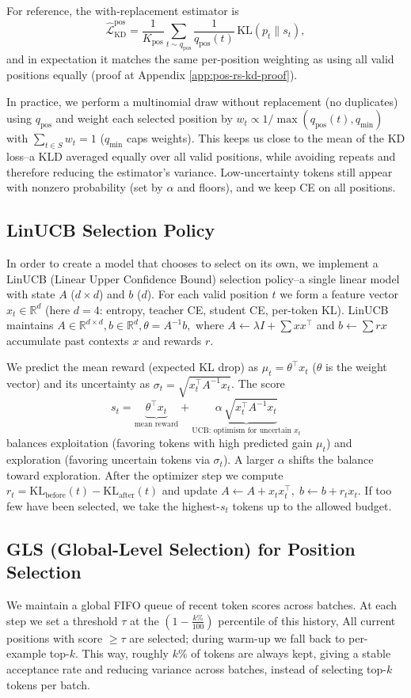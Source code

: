 \documentclass[11pt]{article}
\begin{document}
For reference, the with-replacement estimator is
\[
	\widehat{\mathcal{L}}_{\text{KD}}^{\text{pos}}
	=\frac{1}{K_{\text{pos}}}\sum_{t\sim q_{\text{pos}}}\frac{1}{q_{\text{pos}}(t)}
	\,\mathrm{KL}(p_t\|s_t),
\]
and in expectation it matches the same per-position weighting as using all valid positions equally (proof at Appendix \ref{app:pos-rs-kd-proof}).

In practice, we perform a multinomial draw without replacement (no duplicates) using $q_{\text{pos}}$ and weight each selected position by
$w_t \propto 1/\max(q_{\text{pos}}(t),q_{\min})$ with $\sum_{t\in S} w_t=1$ ($q_{\min}$ caps weights).
This keeps us close to the mean of the KD loss--a KLD averaged equally over all valid positions, while avoiding repeats and therefore reducing the estimator's variance.
Low-uncertainty tokens still appear with nonzero probability (set by $\alpha$ and floors), and we keep CE on all positions.

\subsection{LinUCB Selection Policy}
In order to create a model that chooses to select on its own, we implement a LinUCB (Linear Upper Confidence Bound) selection policy--a single linear model with state $A$ ($d{\times}d$) and $b$ ($d$).
For each valid position $t$ we form a feature vector $x_t\in\mathbb{R}^d$ (here $d{=}4$: entropy, teacher CE, student CE, per-token KL).
LinUCB maintains
\(
A\in\mathbb{R}^{d\times d}, b\in\mathbb{R}^d,
\theta=A^{-1}b,
\)
where $A\!\leftarrow\!\lambda I+\sum x x^\top$ and $b\!\leftarrow\!\sum r x$ accumulate past contexts $x$ and rewards $r$.

We predict the mean reward (expected KL drop) as $\mu_t=\theta^\top x_t$ ($\theta$ is the weight vector) and its uncertainty as
$\sigma_t=\sqrt{x_t^\top A^{-1}x_t}$. The score
\[
	s_t=\underbrace{\theta^\top x_t}_{\text{mean reward}}
	+\underbrace{\alpha\,\sqrt{x_t^\top A^{-1}x_t}}_{\text{UCB: optimism for uncertain }x_t}
\]
balances exploitation (favoring tokens with high predicted gain \(\mu_t\)) and exploration (favoring uncertain tokens via \(\sigma_t\)). A larger \(\alpha\) shifts the balance toward exploration.
After the optimizer step we compute $r_t=\mathrm{KL}_{\text{before}}(t)-\mathrm{KL}_{\text{after}}(t)$ and update
$A\!\leftarrow\!A+x_tx_t^\top,\; b\!\leftarrow\!b+r_tx_t$.
If too few have been selected, we take the highest-$s_t$ tokens up to the allowed budget.

\subsection{GLS (Global-Level Selection) for Position Selection}
We maintain a global FIFO queue of recent token scores across batches.
At each step we set a threshold $\tau$ at the $(1-\tfrac{k\%}{100})$ percentile of this history,
All current positions with score $\ge\tau$ are selected; during warm-up we fall back to per-example top-$k$.
This way, roughly $k\%$ of tokens are always kept, giving a stable acceptance rate and reducing variance across batches, instead of selecting top-$k$ tokens per batch.
\end{document}
